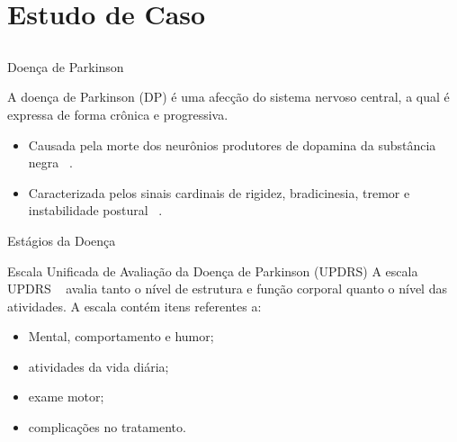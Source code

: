 \documentclass{beamer}
\begin{document}
\section{Estudo de Caso}
\subsection{}
\begin{frame}{Doença de Parkinson}
  \begin{block}{}
    A doença de Parkinson (DP) é uma afecção do sistema nervoso central, a qual é expressa de forma crônica e progressiva. 
      \begin{itemize}[<+->]
       \item Causada pela morte dos neurônios produtores de dopamina da substância negra ~\cite{protpar010}. 
       \item Caracterizada pelos sinais cardinais de rigidez, bradicinesia, tremor e instabilidade postural ~\cite{menezes2003}.
      \end{itemize}
  \end{block}

  
\end{frame}

\begin{frame}{Estágios da Doença}
  \begin{block}{Escala Unificada de Avaliação da Doença de Parkinson (UPDRS)}
    A escala UPDRS ~\cite{updrs87} avalia tanto o nível de estrutura e função corporal quanto o nível das atividades.
      A escala contém itens referentes a:
	\begin{itemize}[<+->]
	 \item Mental, comportamento e humor;
	 \item atividades da vida diária;
	 \item exame motor;
	 \item complicações no tratamento.
	\end{itemize}
 \end{block}
\end{frame}
\end{document}
